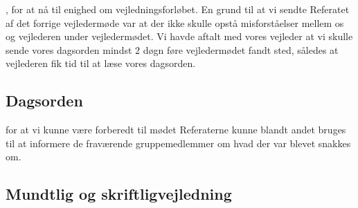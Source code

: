 , for at nå til enighed om vejledningsforløbet.
En grund til at vi sendte Referatet af det forrige vejledermøde var at der ikke skulle opstå misforståelser mellem os og vejlederen under vejledermødet.
Vi havde aftalt med vores vejleder at vi skulle sende vores dagsorden mindst $2$ døgn føre vejledermødet fandt sted, således at vejlederen fik tid til at læse vores dagsorden. 

\subsection{Dagsorden}
for at vi kunne være forberedt til mødet
Referaterne kunne blandt andet bruges til at informere de fraværende gruppemedlemmer om hvad der var blevet snakkes om.


\subsection{Mundtlig og skriftligvejledning}